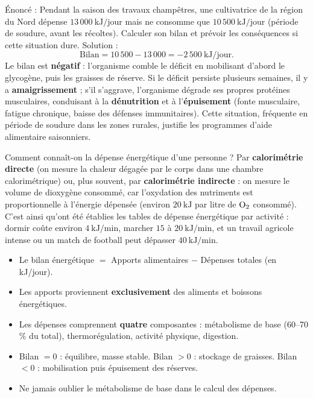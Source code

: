 \documentclass[11pt]{article}
\newcommand{\cle}[1]{{\popxbold\color{popdark}#1}}
\begin{document}
\begin{exoresolu}
Énoncé : Pendant la saison des travaux champêtres, une cultivatrice de la région du Nord dépense $13\,000\ \text{kJ/jour}$ mais ne consomme que $10\,500\ \text{kJ/jour}$ (période de soudure, avant les récoltes). Calculer son bilan et prévoir les conséquences si cette situation dure.
\tcblower
Solution :
\[ \text{Bilan} = 10\,500 - 13\,000 = -2\,500\ \text{kJ/jour}. \]
Le bilan est \textbf{négatif} : l'organisme comble le déficit en mobilisant d'abord le glycogène, puis les graisses de réserve. Si le déficit persiste plusieurs semaines, il y a \textbf{amaigrissement} ; s'il s'aggrave, l'organisme dégrade ses propres protéines musculaires, conduisant à la \textbf{dénutrition} et à l'\textbf{épuisement} (fonte musculaire, fatigue chronique, baisse des défenses immunitaires). Cette situation, fréquente en période de soudure dans les zones rurales, justifie les programmes d'aide alimentaire saisonniers.
\end{exoresolu}

\begin{savaistu}
Comment connaît-on la dépense énergétique d'une personne ? Par \textbf{calorimétrie directe} (on mesure la chaleur dégagée par le corps dans une chambre calorimétrique) ou, plus souvent, par \textbf{calorimétrie indirecte} : on mesure le volume de dioxygène consommé, car l'oxydation des nutriments est proportionnelle à l'énergie dépensée (environ $20\ \text{kJ}$ par litre de $\ce{O2}$ consommé). C'est ainsi qu'ont été établies les tables de dépense énergétique par activité : dormir coûte environ $4\ \text{kJ/min}$, marcher $15$ à $20\ \text{kJ/min}$, et un travail agricole intense ou un match de football peut dépasser $40\ \text{kJ/min}$.
\end{savaistu}

\begin{aretenir}
\begin{itemize}
\item Le \cle{bilan énergétique} $=$ Apports alimentaires $-$ Dépenses totales (en kJ/jour).
\item Les apports proviennent \textbf{exclusivement} des aliments et boissons énergétiques.
\item Les dépenses comprennent \textbf{quatre} composantes : métabolisme de base (60--70 \% du total), thermorégulation, activité physique, digestion.
\item Bilan $= 0$ : équilibre, masse stable. Bilan $> 0$ : stockage de graisses. Bilan $< 0$ : mobilisation puis épuisement des réserves.
\item Ne jamais oublier le métabolisme de base dans le calcul des dépenses.
\end{itemize}
\end{aretenir}
\end{document}
